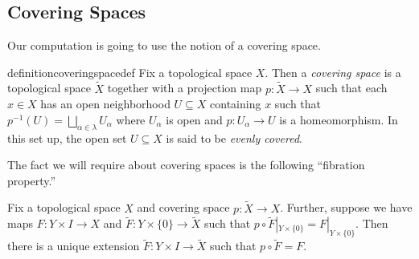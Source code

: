 \documentclass[../notes.tex]{subfiles}
\begin{document}
\subsection{Covering Spaces}
Our computation is going to use the notion of a covering space.
\begin{restatable}{definition}{coveringspacedef}
	Fix a topological space $X$. Then a \textit{covering space} is a topological space $\widetilde X$ together with a projection map $p\colon\widetilde X\to X$ such that each $x\in X$ has an open neighborhood $U\subseteq X$ containing $x$ such that $p^{-1}(U)=\bigsqcup_{\alpha\in\lambda}U_\alpha$ where $U_\alpha$ is open and $p\colon U_\alpha\to U$ is a homeomorphism. In this set up, the open set $U\subseteq X$ is said to be \textit{evenly covered}.
\end{restatable}
\noindent The fact we will require about covering spaces is the following ``fibration property.''
\begin{proposition} \label{prop:fibration-prop}
	Fix a topological space $X$ and covering space $p\colon\widetilde X\to X$. Further, suppose we have maps $F\colon Y\times I\to X$ and $\widetilde F\colon Y\times\{0\}\to\widetilde X$ such that $p\circ\widetilde F|_{Y\times\{0\}}=F|_{Y\times\{0\}}$. Then there is a unique extension $\widetilde F\colon Y\times I\to\widetilde X$ such that $p\circ\widetilde F=F$.
\end{proposition}
\end{document}
